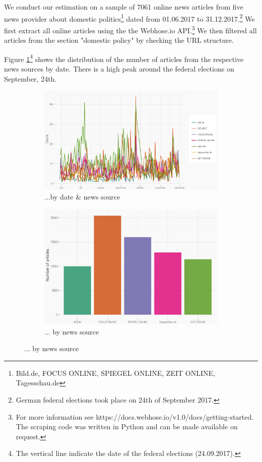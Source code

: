 \documentclass[12pt,a4paper,notitlepage]{article}
\begin{document}
We conduct our estimation on a sample of 7061 online news articles from five news provider about domestic politics\footnote{Bild.de, FOCUS ONLINE, SPIEGEL ONLINE, ZEIT ONLINE, Tagesschau.de} dated from 01.06.2017 to 31.12.2017.\footnote{German federal elections took place on 24th of September 2017.} We first extract all online articles using the the Webhose.io API.\footnote{For more information see https://docs.webhose.io/v1.0/docs/getting-started. The scraping code was written in Python and can be made available on request.} We then filtered all articles from the section "domestic policy" by checking the URL structure. 

Figure \ref{fig_distr1}\footnote{The vertical line indicate the date of the federal elections (24.09.2017).} shows the distribution of the number of articles from the respective news sources by date. There is a high peak around the federal elections on September, 24th.  

\begin{figure}[H]
	\caption{Article distribution...}
	\begin{center}
		\begin{subfigure}[normla]{0.8\textwidth}
			\includegraphics[width=\textwidth]{../figs/timeline.png}
			\caption{...by date \& news source}
			\label{fig_distr1}
		\end{subfigure}
		\begin{subfigure}[normla]{0.8\textwidth}
			\includegraphics[width=\textwidth]{../figs/bar.png}
			\caption{... by news source}
			\label{fig_distr2}
		\end{subfigure}
	\end{center}
\end{figure}
\end{document}
